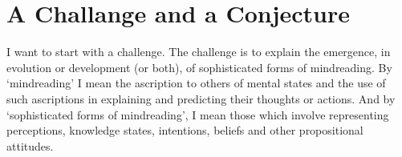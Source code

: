 \documentclass[12pt,\papersize]{extarticle}
\date{}
\begin{document}
\setlength\footnotesep{1em}


\maketitle
\title{}

\begin{abstract}
\noindent
***
\end{abstract}




\section{A Challange and a Conjecture}

I want to start with a challenge.  
The challenge is to explain the emergence, in evolution or development (or both), of sophisticated forms of mindreading. 
By `mindreading' I mean the ascription to others of mental states and the use of such ascriptions in explaining and predicting their thoughts or actions. 
And by  `sophisticated forms of mindreading', I mean those which involve representing perceptions, knowledge states, intentions, beliefs and other propositional attitudes. 
\end{document}
